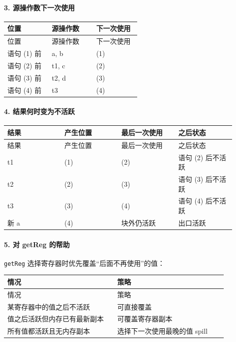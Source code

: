 \documentclass[UTF8]{ctexart}
\begin{document}
\paragraph*{3. 源操作数下一次使用}

\begin{longtable}{|p{0.31\linewidth}|p{0.31\linewidth}|p{0.31\linewidth}|}
\hline
位置 & 源操作数 & 下一次使用 \\
\hline
\endfirsthead
位置 & 源操作数 & 下一次使用 \\
\hline
\endhead
语句 (1) 前 & a, b & (1) \\
\hline
语句 (2) 前 & t1, c & (2) \\
\hline
语句 (3) 前 & t2, d & (3) \\
\hline
语句 (4) 前 & t3 & (4) \\
\hline
\end{longtable}

\paragraph*{4. 结果何时变为不活跃}

\begin{longtable}{|p{0.23\linewidth}|p{0.23\linewidth}|p{0.23\linewidth}|p{0.23\linewidth}|}
\hline
结果 & 产生位置 & 最后一次使用 & 之后状态 \\
\hline
\endfirsthead
结果 & 产生位置 & 最后一次使用 & 之后状态 \\
\hline
\endhead
t1 & (1) & (2) & 语句 (2) 后不活跃 \\
\hline
t2 & (2) & (3) & 语句 (3) 后不活跃 \\
\hline
t3 & (3) & (4) & 语句 (4) 后不活跃 \\
\hline
新 a & (4) & 块外仍活跃 & 出口活跃 \\
\hline
\end{longtable}

\paragraph*{5. 对 getReg 的帮助}

\texttt{getReg} 选择寄存器时优先覆盖“后面不再使用”的值：

\begin{longtable}{|p{0.47\linewidth}|p{0.47\linewidth}|}
\hline
情况 & 策略 \\
\hline
\endfirsthead
情况 & 策略 \\
\hline
\endhead
某寄存器中的值之后不活跃 & 可直接覆盖 \\
\hline
值之后活跃但内存已有最新副本 & 可覆盖寄存器副本 \\
\hline
所有值都活跃且无内存副本 & 选择下一次使用最晚的值 spill \\
\hline
\end{longtable}
\end{document}
